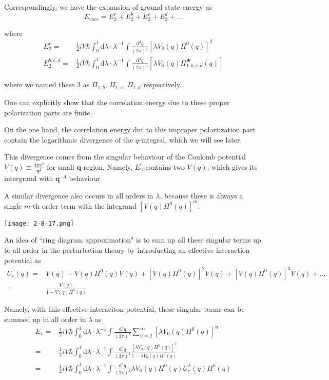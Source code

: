Correspondingly, we have the expansion of ground state energy as
\[E_{corr} = E_2^r + E_2^b + E_2^c + E_2^d+\ldots\]

where
\[\begin{split}E_2^r =& \frac{1}{2}i V \hbar \int_0^1 \mathrm{d} \lambda \cdot \lambda^{-1} \int \frac{\mathrm{d}^4 q}{(2\pi)^4} \left[ \lambda V_0(q)\Pi^0(q) \right]^2\\
E_2^{b,c,d} =& \frac{1}{2}i V \hbar \int_0^1 \mathrm{d} \lambda \cdot \lambda^{-1} \int \frac{\mathrm{d}^4 q}{(2\pi)^4} \left[ \lambda V_0(q)\Pi^\bigstar_{1,b,c,d}(q) \right]
 \end{split}\]

where we named these 3 as $\Pi_{1,b}$, $\Pi_{1,c}$, $\Pi_{1,d}$ respectively.

One can explicitly show that the correlation energy due to these proper polarization parts are finite.

On the one hand, the correlation energy dut to this improper polartization part contain the logarithmic divergence of the $q$-integral, which we will see later.

This divergence comes from the singular behaviour of the Coulomb potential $V(q)\equiv \frac{4\pi e^2}{\mathbf{q}^2}$ for small $\mathbf{q}$ region. Namely, $E_2^r$ contains two $V(q)$, which gives its intergrand with $\mathbf{q}^{-4}$ behaviour.

A similar divergence also occurs in all orders in $\lambda$, because these is always a single $m$-th order term with the integrand $\left[ V(q) \Pi^0(q) \right]^m$.

\begin{center} \label{Fig2.8.17}
\texttt{[image: 2-8-17.png]}
\end{center}

An idea of ``ring diagram approximation" is to sum up all these singular terms up to all order in the perturbation theory by introducting an effective interaction potential as
\[\begin{split} U_r(q) =& V(q) + V(q)\Pi^0(q) V(q) + [V(q)\Pi^0(q)]^2 V(q) + [V(q)\Pi^0(q)]^3 V(q) + \ldots \\ 
=& \frac{V(q)}{1-V(q)\Pi^0(q)}
\end{split}\]

Namely, with this effective interaciton potential, these singular terms can be summed up in all order in $\lambda$ as
\begin{equation} \label{Eqs2.8.9} \begin{split}
E_r =& \frac{1}{2}i V\hbar \int_0^1 \mathrm{d} \lambda \cdot \lambda^{-1} \int \frac{\mathrm{d}^4 q}{(2\pi)^4} \sum_{n=2}^\infty [ \lambda V_0(q) \Pi^0(q) ]^n\\
=& \frac{1}{2}i V\hbar \int_0^1 \mathrm{d} \lambda \cdot \lambda^{-1} \int \frac{\mathrm{d}^4 q}{(2\pi)^4} \frac{[\lambda V_0(q) \Pi^0(q)]^2}{1-\lambda V_0(q) \Pi^0(q)}\\
=& \frac{1}{2}i V\hbar \int_0^1 \mathrm{d} \lambda \cdot \lambda^{-1} \int \frac{\mathrm{d}^4 q}{(2\pi)^4} \lambda V_0(q) \Pi^0(q) \underline{U_r^\lambda(q)} \Pi^0(q)
\end{split}\end{equation}

